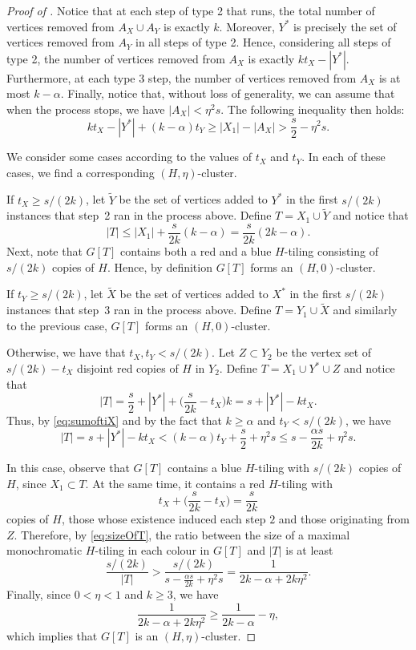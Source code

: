 \documentclass[a4paper,reqno,11pt]{amsart}
\theoremstyle{definition}
\theoremstyle{remark}
\renewcommand\le{\leqslant}
\renewcommand\ge{\geqslant}
\begin{document}
\begin{proof}[Proof of ]
Notice that at each step of type 2 that runs, the total number of vertices removed from $A_X \cup A_Y$ is exactly $k$. Moreover, $Y^*$ is precisely the set of vertices removed from $A_Y$ in all steps of type 2. Hence, considering all steps of type 2, the number of vertices removed from $A_X$ is exactly $kt_X-|Y^*|$. Furthermore, at each type 3 step, the number of vertices removed from $A_X$ is at most $k-\alpha$. 
Finally, notice that, without loss of generality, we can assume that when the process stops, we have $|A_X| < \eta^2 s$. The following inequality then holds:
\begin{equation}\label{eq:sumoftiX}
    kt_X - |Y^*| +  (k-\alpha)t_Y  \ge |X_1| - |A_X| > \frac{s}{2} - \eta^2s.
\end{equation}

We consider some cases according to the values of $t_X$ and $t_Y$. In each of these cases, we find a corresponding $(H,\eta)$-cluster.

If $t_X \ge s/(2k)$, let $\widetilde{Y}$ be the set of vertices added to $Y^*$ in the first $s/(2k)$ instances that step~2 ran in the process above. Define $T = X_1 \cup \widetilde{Y}$ and notice that
\[|T| \le |X_1| + \frac{s}{2k}(k-\alpha) = \frac{s}{2k}  (2k-\alpha).\]
Next, note that $G[T]$ contains both a red and a blue $H$-tiling consisting of $s / (2k)$ copies of $H$. Hence, by definition $G[T]$ forms an $(H,0)$-cluster.

If $t_Y \ge s/(2k)$, let $\widetilde{X}$ be the set of vertices added to $X^*$ in the first $s/(2k)$ instances that step~3 ran in the process above. Define $T = Y_1 \cup \widetilde{X}$ and similarly to the previous case, $G[T]$ forms an $(H,0)$-cluster.

Otherwise, we have that $t_X,t_Y < s/(2k)$. Let $Z\subset Y_2$ be the vertex set of  $s/(2k)-t_X$ disjoint red copies of $H$ in $Y_2$. Define $T = X_1 \cup Y^* \cup Z$ and notice that
\[
|T| = \frac{s}{2} + |Y^*| + \Big(\frac{s}{2k} - t_X\Big)k = s + |Y^*| - k t_X.
\]
Thus, by \eqref{eq:sumoftiX} and by the fact that $k \ge \alpha$ and $t_Y < s / (2k)$, we have 
\begin{equation}\label{eq:sizeOfT}
|T| = s + |Y^*| - kt_X < (k-\alpha)t_Y + \frac{s}{2} + \eta^2s \le s - \frac{\alpha s}{2k} + \eta^2s.
\end{equation}

In this case, observe that $G[T]$ contains a blue $H$-tiling with $s/(2k)$ copies of $H$, since $X_1 \subset T$. At the same time, it contains a red $H$-tiling with
\[
t_X + \Big(\frac{s}{2k} - t_X\Big) = \frac{s}{2k}
\]
copies of $H$, those whose existence induced each step $2$ and those originating from $Z$. Therefore, by \eqref{eq:sizeOfT}, the ratio between the size of a maximal monochromatic $H$-tiling in each colour in $G[T]$ and $|T|$ is at least
\[
\frac{s / (2k)}{|T|}
> \frac{s / (2k)}{s - \frac{\alpha s}{2k} + \eta^2s} = \frac{1}{2k - \alpha + 2k\eta^2}.
\]
Finally, since $0< \eta < 1$ and $k \ge 3$, we have
\[\frac{1}{2k - \alpha + 2k\eta^2}
\ge \frac{1}{2k - \alpha} - \eta,
\]
which implies that $G[T]$ is an $(H,\eta)$-cluster.
\end{proof}
\end{document}
